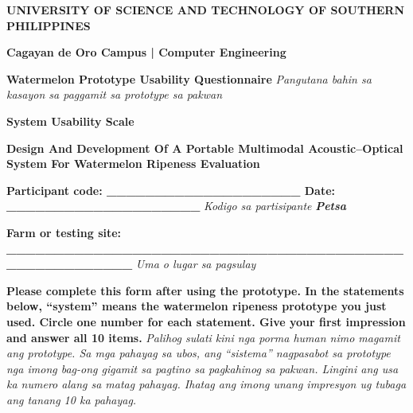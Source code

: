 \ifeditablerecords



\textbf{UNIVERSITY OF SCIENCE AND TECHNOLOGY OF SOUTHERN PHILIPPINES}

\textbf{Cagayan de Oro Campus | Computer Engineering}

\textbf{Watermelon Prototype Usability Questionnaire} \textit{Pangutana bahin sa kasayon sa paggamit sa prototype sa pakwan}

\textbf{System Usability Scale}

\textbf{Design And Development Of A Portable Multimodal Acoustic–Optical System For Watermelon Ripeness Evaluation}

\textbf{Participant code: \_\allowbreak{}\_\allowbreak{}\_\allowbreak{}\_\allowbreak{}\_\allowbreak{}\_\allowbreak{}\_\allowbreak{}\_\allowbreak{}\_\allowbreak{}\_\allowbreak{}\_\allowbreak{}\_\allowbreak{}\_\allowbreak{}\_\allowbreak{}\_\allowbreak{}\_\allowbreak{}\_\allowbreak{}\_\allowbreak{}\_\allowbreak{}\_\allowbreak{} Date: \_\allowbreak{}\_\allowbreak{}\_\allowbreak{}\_\allowbreak{}\_\allowbreak{}\_\allowbreak{}\_\allowbreak{}\_\allowbreak{}\_\allowbreak{}\_\allowbreak{}\_\allowbreak{}\_\allowbreak{}\_\allowbreak{}\_\allowbreak{}\_\allowbreak{}\_\allowbreak{}\_\allowbreak{}\_\allowbreak{}\_\allowbreak{}\_\allowbreak{}} \textit{Kodigo sa partisipante} \textbf{\textit{Petsa}}

\textbf{Farm or testing site: \_\allowbreak{}\_\allowbreak{}\_\allowbreak{}\_\allowbreak{}\_\allowbreak{}\_\allowbreak{}\_\allowbreak{}\_\allowbreak{}\_\allowbreak{}\_\allowbreak{}\_\allowbreak{}\_\allowbreak{}\_\allowbreak{}\_\allowbreak{}\_\allowbreak{}\_\allowbreak{}\_\allowbreak{}\_\allowbreak{}\_\allowbreak{}\_\allowbreak{}\_\allowbreak{}\_\allowbreak{}\_\allowbreak{}\_\allowbreak{}\_\allowbreak{}\_\allowbreak{}\_\allowbreak{}\_\allowbreak{}\_\allowbreak{}\_\allowbreak{}\_\allowbreak{}\_\allowbreak{}\_\allowbreak{}\_\allowbreak{}\_\allowbreak{}\_\allowbreak{}\_\allowbreak{}\_\allowbreak{}\_\allowbreak{}\_\allowbreak{}\_\allowbreak{}\_\allowbreak{}\_\allowbreak{}\_\allowbreak{}\_\allowbreak{}\_\allowbreak{}\_\allowbreak{}\_\allowbreak{}\_\allowbreak{}\_\allowbreak{}\_\allowbreak{}\_\allowbreak{}\_\allowbreak{}\_\allowbreak{}} \textit{Uma o lugar sa pagsulay}

\textbf{Please complete this form after using the prototype. In the statements below, “system” means the watermelon ripeness prototype you just used. Circle one number for each statement. Give your first impression and answer all 10 items.} \textit{Palihog sulati kini nga porma human nimo magamit ang prototype. Sa mga pahayag sa ubos, ang “sistema” nagpasabot sa prototype nga imong bag-ong gigamit sa pagtino sa pagkahinog sa pakwan. Lingini ang usa ka numero alang sa matag pahayag. Ihatag ang imong unang impresyon ug tubaga ang tanang 10 ka pahayag.}

